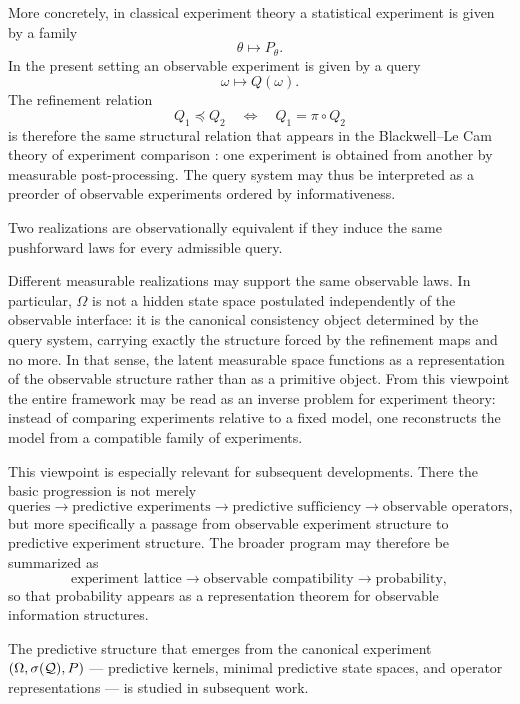 More concretely, in classical experiment theory a statistical
experiment is given by a family
\[
\theta \mapsto P_\theta .
\]
In the present setting an observable experiment is given by a query
\[
\omega \mapsto Q(\omega).
\]
The refinement relation
\[
Q_1 \preceq Q_2
\quad\Longleftrightarrow\quad
Q_1 = \pi \circ Q_2
\]
is therefore the same structural relation that appears in the
Blackwell--Le Cam theory of experiment comparison \cite{Blackwell,LeCam,Torgersen}: one experiment is
obtained from another by measurable post-processing.  The query system
may thus be interpreted as a preorder of observable experiments
ordered by informativeness.

\begin{definition}
Two realizations are observationally equivalent if they induce the same
pushforward laws for every admissible query.
\end{definition}

Different measurable realizations may support the same observable laws.
In particular, $\Omega$ is not a hidden state space postulated
independently of the observable interface: it is the canonical
consistency object determined by the query system, carrying exactly
the structure forced by the refinement maps and no more.
In that sense, the latent measurable space functions as a representation
of the observable structure rather than as a primitive object.
From this viewpoint the entire framework may be read as an inverse
problem for experiment theory: instead of comparing experiments
relative to a fixed model, one reconstructs the model from a
compatible family of experiments.

This viewpoint is especially relevant for subsequent developments.
There the basic progression is not merely
\[
\text{queries}
\rightarrow
\text{predictive experiments}
\rightarrow
\text{predictive sufficiency}
\rightarrow
\text{observable operators},
\]
but more specifically a passage from observable experiment structure
to predictive experiment structure.  The broader program may therefore
be summarized as
\[
\text{experiment lattice} \rightarrow \text{observable compatibility} \rightarrow \text{probability},
\]
so that probability appears as a representation theorem for observable
information structures.

The predictive structure that emerges from the canonical experiment
$(\Omega,\sigma(\mathcal{Q}),P)$ --- predictive kernels, minimal predictive
state spaces, and operator representations --- is studied in subsequent
work.


